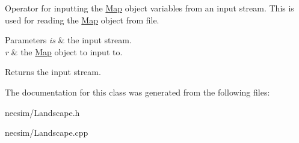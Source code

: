 Operator for inputting the \hyperlink{class_map}{Map} object variables from an input stream. This is used for reading the \hyperlink{class_map}{Map} object from file. 


\begin{DoxyParams}{Parameters}
{\em is} & the input stream. \\
\hline
{\em r} & the \hyperlink{class_map}{Map} object to input to. \\
\hline
\end{DoxyParams}
\begin{DoxyReturn}{Returns}
the input stream. 
\end{DoxyReturn}


The documentation for this class was generated from the following files\+:\begin{DoxyCompactItemize}
\item 
necsim/Landscape.\+h\item 
necsim/Landscape.\+cpp\end{DoxyCompactItemize}
